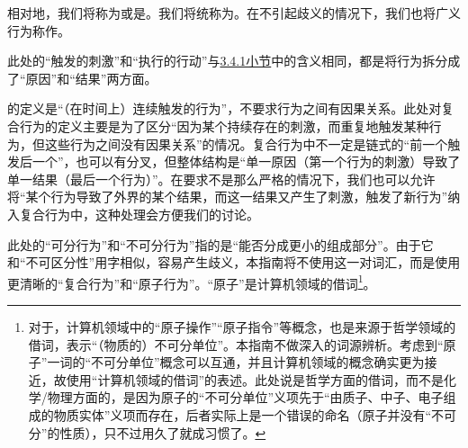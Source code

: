 相对地，我们将称为或是。我们将统称为。在不引起歧义的情况下，我们也将广义行为称作。
\begin{explain}
此处的“触发的刺激”和“执行的行动”与\hyperref[sec:并行与竞争]{3.4.1小节}中的含义相同，都是将行为拆分成了“原因”和“结果”两方面。

的定义是“（在时间上）连续触发的行为”，不要求行为之间有因果关系。此处对复合行为的定义主要是为了区分“因为某个持续存在的刺激，而重复地触发某种行为，但这些行为之间没有因果关系”的情况。复合行为中不一定是链式的“前一个触发后一个”，也可以有分叉，但整体结构是“单一原因（第一个行为的刺激）导致了单一结果（最后一个行为）”。在要求不是那么严格的情况下，我们也可以允许将“某个行为导致了外界的某个结果，而这一结果又产生了刺激，触发了新行为”纳入复合行为中，这种处理会方便我们的讨论。

此处的“可分行为”和“不可分行为”指的是“能否分成更小的组成部分”。由于它和“不可区分性”用字相似，容易产生歧义，本指南将不使用这一对词汇，而是使用更清晰的“复合行为”和“原子行为”。“原子”是计算机领域的借词\footnote{对于\rigorous，计算机领域中的“原子操作”“原子指令”等概念，也是来源于哲学领域的借词，表示“（物质的）不可分单位”。本指南不做深入的词源辨析。考虑到“原子”一词的“不可分单位”概念可以互通，并且计算机领域的概念确实更为接近，故使用“计算机领域的借词”的表述。此处说是哲学方面的借词，而不是化学/物理方面的，是因为原子的“不可分单位”义项先于“由质子、中子、电子组成的物质实体”义项而存在，后者实际上是一个错误的命名（原子并没有“不可分”的性质），只不过用久了就成习惯了。}。
\end{explain}
